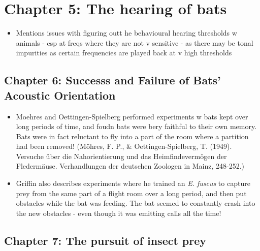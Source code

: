 \documentclass[
]{book}
\providecommand{\tightlist}{%
  \setlength{\itemsep}{0pt}\setlength{\parskip}{0pt}}
\begin{document}
\hypertarget{chapter-5-the-hearing-of-bats}{%
\section{Chapter 5: The hearing of bats}\label{chapter-5-the-hearing-of-bats}}

\begin{itemize}
\tightlist
\item
  Mentions issues with figuring outt he behavioural hearing thresholds w animals - esp at freqs where they are not v sensitive - as there may be tonal impurities as certain frequencies are played back at v high thresholds
\end{itemize}

\hypertarget{chapter-6-successs-and-failure-of-bats-acoustic-orientation}{%
\subsection{Chapter 6: Successs and Failure of Bats' Acoustic Orientation}\label{chapter-6-successs-and-failure-of-bats-acoustic-orientation}}

\begin{itemize}
\item
  Moehres and Oettingen-Spielberg performed experiments w bats kept over long periods of time, and foudn bats were bery faithful to their own memory. Bats were in fact reluctant to fly into a part of the room where a partition had been removed! (Möhres, F. P., \& Oettingen-Spielberg, T. (1949). Versuche über die Nahorientierung und das Heimfindevermögen der Fledermäuse. Verhandlungen der deutschen Zoologen in Mainz, 248-252.)
\item
  Griffin also describes experiments where he trained an \emph{E. fuscus} to capture prey from the same part of a flight room over a long period, and then put obstacles while the bat was feeding. The bat seemed to constantly crash into the new obstacles - even though it was emitting calls all the time!
\end{itemize}

\hypertarget{chapter-7-the-pursuit-of-insect-prey}{%
\subsection{Chapter 7: The pursuit of insect prey}\label{chapter-7-the-pursuit-of-insect-prey}}
\end{document}
